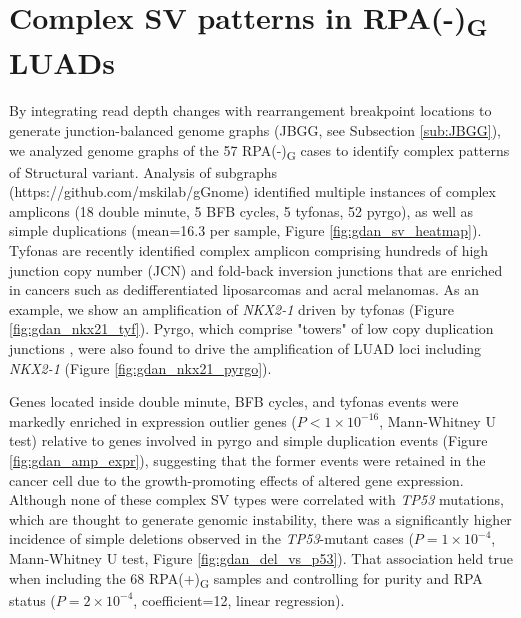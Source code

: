 \documentclass[phd,tocprelim]{cornell}
\renewcommand{\caption}[1]{\singlespacing\hangcaption{#1}\normalspacing}
\begin{document}
\clearpage
\section{Complex SV patterns in RPA(-)\textsubscript{G} LUADs}
By integrating read depth changes with rearrangement breakpoint locations to generate junction-balanced genome graphs (JBGG, see Subsection \ref{sub:JBGG}), we analyzed genome graphs \cite{Hadi2020-um} of the 57 RPA(-)\textsubscript{G} cases to identify complex patterns of Structural variant. Analysis of subgraphs (https://github.com/mskilab/gGnome) identified multiple instances of complex amplicons (18 double minute, 5 BFB cycles, 5 tyfonas, 52 pyrgo), as well as simple duplications (mean=16.3 per sample, Figure \ref{fig:gdan_sv_heatmap}). Tyfonas are recently identified complex amplicon comprising hundreds of high junction copy number (JCN) and fold-back inversion junctions \cite{Hadi2020-um} that are enriched in cancers such as dedifferentiated liposarcomas and acral melanomas. As an example, we show an amplification of \textit{NKX2-1} driven by tyfonas (Figure \ref{fig:gdan_nkx21_tyf}). Pyrgo, which comprise "towers" of low copy duplication junctions \cite{Hadi2020-um}, were also found to drive the amplification of LUAD loci including \textit{NKX2-1} (Figure \ref{fig:gdan_nkx21_pyrgo}).

Genes located inside double minute, BFB cycles, and tyfonas events were markedly enriched in expression outlier genes ($P < 1 \times 10^{-16}$, Mann-Whitney U test) relative to genes involved in pyrgo and simple duplication events (Figure \ref{fig:gdan_amp_expr}), suggesting that the former events were retained in the cancer cell due to the growth-promoting effects of altered gene expression. Although none of these complex SV types were correlated with \textit{TP53} mutations, which are thought to generate genomic instability, there was a significantly higher incidence of simple deletions observed in the \textit{TP53}-mutant cases ($P=1 \times 10^{-4}$, Mann-Whitney U test, Figure \ref{fig:gdan_del_vs_p53}). That association held true when including the 68 RPA(+)\textsubscript{G} samples and controlling for purity and RPA status ($P=2 \times 10^{-4}$, coefficient=12, linear regression).
\end{document}
